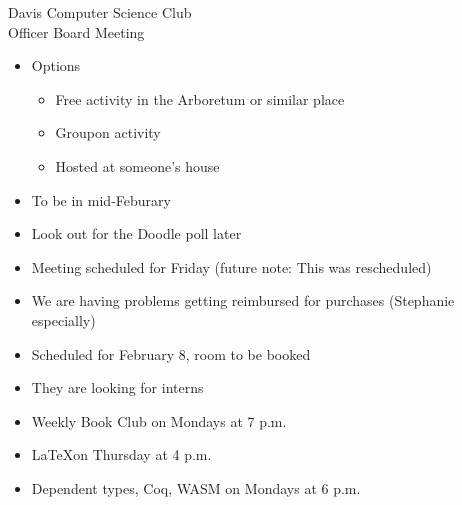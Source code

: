 \documentclass{article}
\begin{document}
\begin{Minutes}{Davis Computer Science Club\\Officer Board Meeting}
\missingExcused{}




\maketitle
{}
\begin{itemize}
\item Options
  \begin{itemize}
  \item Free activity in the Arboretum or similar place
  \item Groupon activity
  \item Hosted at someone's house
  \end{itemize}
\item To be in mid-Feburary
\item Look out for the Doodle poll later
\end{itemize}
\begin{itemize}
\item Meeting scheduled for Friday (future note: This was rescheduled)
\item We are having problems getting reimbursed for purchases (Stephanie especially)
\end{itemize}
\begin{itemize}
\item Scheduled for February 8, room to be booked
\item They are looking for interns
\end{itemize}
\begin{itemize}
\item Weekly Book Club on Mondays at 7 p.m.
\item \LaTeX on Thursday at 4 p.m.
\item Dependent types, Coq, WASM on Mondays at 6 p.m.

\end{itemize}
\end{Minutes}
\end{document}
